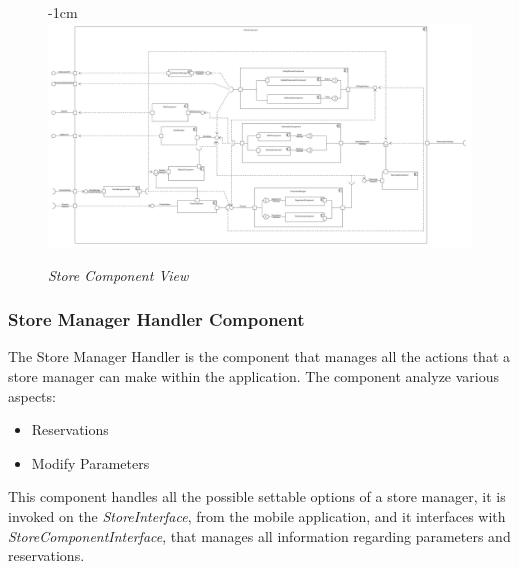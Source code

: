 \documentclass{article}
\begin{document}
			\begin{figure}[H]
				\begin{adjustwidth} {-1cm}{}
					\centering
					\includegraphics[scale=0.22, angle=90, trim= 0 0 0 -5cm]{Component Diagrams/ReorderedStoreComponentView.pdf}\\
				\end{adjustwidth}
				\caption{\emph{Store Component View}}
			\end{figure}
			\newpage
			
		\subsubsection{Store Manager Handler Component}
			The Store Manager Handler is the component that manages all the actions that a store manager can make within the application. The component analyze various aspects:
			
			\begin{itemize}
				\item Reservations
				\item Modify Parameters
			\end{itemize}
		
			This component handles all the possible settable options of a store manager, it is invoked on the \emph{StoreInterface}, from the mobile application, and it interfaces with \emph{StoreComponentInterface}, that manages all information regarding parameters and reservations.
			
\end{document}
